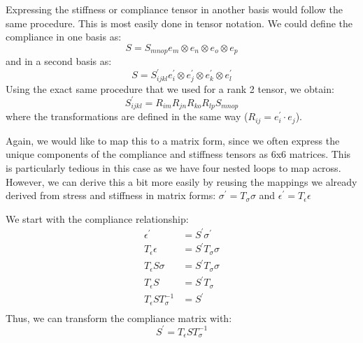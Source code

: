 \documentclass{article}
\begin{document}
Expressing the stiffness or compliance tensor in another basis would follow the same procedure.  This is most easily done in tensor notation.  We could define the compliance in one basis as:
\begin{equation}
S = S_{mnop} e_m \otimes e_n \otimes e_o \otimes e_p
\end{equation}
and in a second basis as:
\begin{equation}
S = S^\prime_{ijkl} e^\prime_i \otimes e^\prime_j \otimes e^\prime_k \otimes e^\prime_l
\end{equation}
Using the exact same procedure that we used for a rank 2 tensor, we obtain:
\begin{equation}
S^\prime_{ijkl} = R_{im} R_{jn} R_{ko} R_{lp} S_{mnop}
\end{equation}
where the transformations are defined in the same way ($R_{ij} = e_i^\prime \cdot e_j$).

Again, we would like to map this to a matrix form, since we often express the unique components of the compliance and stiffness tensors as 6x6 matrices.  This is particularly tedious in this case as we have four nested loops to map across.  However, we can derive this a bit more easily by reusing the mappings we already derived from stress and stiffness in matrix forms: $\sigma^\prime = T_\sigma \sigma$ and $\epsilon^\prime = T_\epsilon \epsilon$



We start with the compliance relationship:
\begin{equation}
\begin{aligned}
\epsilon^\prime & = S^\prime \sigma^\prime \\
T_\epsilon \epsilon & = S^\prime T_\sigma \sigma \\
T_\epsilon S \sigma & = S^\prime T_\sigma \sigma \\
T_\epsilon S  & = S^\prime T_\sigma  \\
T_\epsilon S T_\sigma^{-1}  & = S^\prime  \\
\end{aligned}
\end{equation}
Thus, we can transform the compliance matrix with:
\begin{equation}
S^\prime = T_\epsilon S T_\sigma^{-1}
\end{equation}
\end{document}
